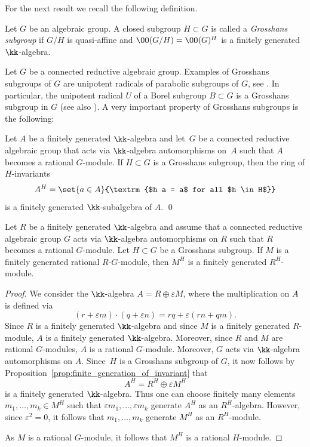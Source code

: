 For the next result we recall the following definition.

\begin{definition}
Let $G$ be an algebraic group. A closed subgroup $H \subset G$
is called a \emph{Grosshans subgroup} if $G/H$ is quasi-affine and
$\OO(G/H) = \OO(G)^H$ is a finitely generated $\kk$-algebra.
\end{definition}

Let $G$ be a connected reductive algebraic group.
Examples of Grosshans subgroups of $G$ are unipotent radicals of parabolic
subgroups of $G$, see \cite[Th.\,16.4]{Gr1997Algebraic-homogene}.
In particular, the unipotent radical $U$ of a Borel subgroup
$B \subset G$ is a Grosshans subgroup in $G$
(see also \cite[Th.\,9.4]{Gr1997Algebraic-homogene}). A very important property of Grosshans subgroups is the following:

\begin{proposition}
\label{prop:finite_generation_of_invariant}
Let $A$ be a finitely generated $\kk$-algebra and let~$G$
be a connected reductive algebraic group that acts via $\kk$-algebra automorphisms on~$A$
such that $A$ becomes a rational $G$-module.
If $H \subset G$ is a Grosshans subgroup, then the ring of $H$-invariants
\[
A^H = \set{a \in A}{\textrm{$h a = a$ for all $h \in H$}}
\]
is a finitely generated $\kk$-subalgebra of $A$. \qed
\end{proposition}

\begin{proposition}
\label{prop.MU_finitely_generated}
Let $R$ be a finitely generated $\kk$-algebra and assume
that a connected reductive algebraic group
$G$ acts via $\kk$-algebra automorphisms on $R$ such that
$R$ becomes a rational $G$-module. Let $H \subset G$ be a
Grosshans subgroup.
If $M$ is a finitely generated rational $R$-$G$-module,
then $M^H$ is a finitely generated $R^H$-module.
\end{proposition}

\begin{proof}
We consider the $\kk$-algebra $A = R \oplus \varepsilon M$, where the
multiplication on $A$ is defined via
\[
(r + \varepsilon m) \cdot (q + \varepsilon n) =
rq + \varepsilon (rn+qm).
\]
Since $R$ is a finitely generated $\kk$-algebra and since $M$
is a finitely generated $R$-module, $A$ is a finitely generated $\kk$-algebra.
Moreover, since $R$ and $M$ are rational $G$-modules,
$A$ is a rational $G$-module. Moreover,
$G$ acts via $\kk$-algebra automorphisms on $A$.
Since~$H$ is a Grosshans subgroup of $G$, it now follows
by Proposition~\ref{prop:finite_generation_of_invariant}
that
\[
A^H = R^H \oplus \varepsilon M^H
\]
is a finitely generated $\kk$-algebra. Thus one can choose
finitely many elements $m_1, \ldots, m_k \in M^H$
such that $\varepsilon m_1, \ldots, \varepsilon m_k$ generate $A^H$
as an $R^H$-algebra. However, since $\varepsilon^2 = 0$, it follows
that $m_1, \ldots, m_k$ generate $M^H$ as an $R^H$-module.

As $M$ is a rational $G$-module, it follows that $M^H$ is a rational $H$-module.
\end{proof}

